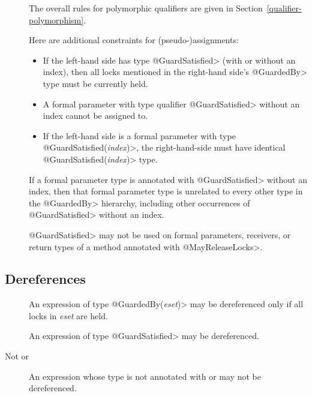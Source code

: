 \begin{description}

\item[]

  The overall rules for polymorphic qualifiers are given in
  Section~\ref{qualifier-polymorphism}.

  Here are additional constraints for (pseudo-)assignments:

  \begin{itemize}
  \item
    If the left-hand side has type \<@GuardSatisfied> (with or without an index),
    then all locks mentioned in the right-hand side's \<@GuardedBy> type
    must be currently held.
  \item
    A formal parameter with type qualifier \<@GuardSatisfied> without an
    index cannot be assigned to.
  \item
    If the left-hand side is a formal parameter with type
    \<@GuardSatisfied(\emph{index})>, the right-hand-side must have
    identical \<@GuardSatisfied(\emph{index})> type.
  \end{itemize}

  If a formal parameter type is
  annotated with \<@GuardSatisfied> without an index, then that formal parameter
  type is unrelated to every other type in the \<@GuardedBy> hierarchy,
  including other occurrences of \<@GuardSatisfied> without an index.

  \<@GuardSatisfied> may not be used on formal parameters, receivers, or
  return types of a method annotated with \<@MayReleaseLocks>.
\end{description}

\subsection{Dereferences\label{lock-type-checking-rules-dereferences}}

\begin{description}

\item[]
  An expression of type \<@GuardedBy(\emph{eset})> may be dereferenced only
  if all locks in \emph{eset} are held.

\item[]
  An expression of type \<@GuardSatisfied> may be dereferenced.

\item[Not  or ]
  An expression whose type is not annotated with  or
   may not be dereferenced.

\end{description}

